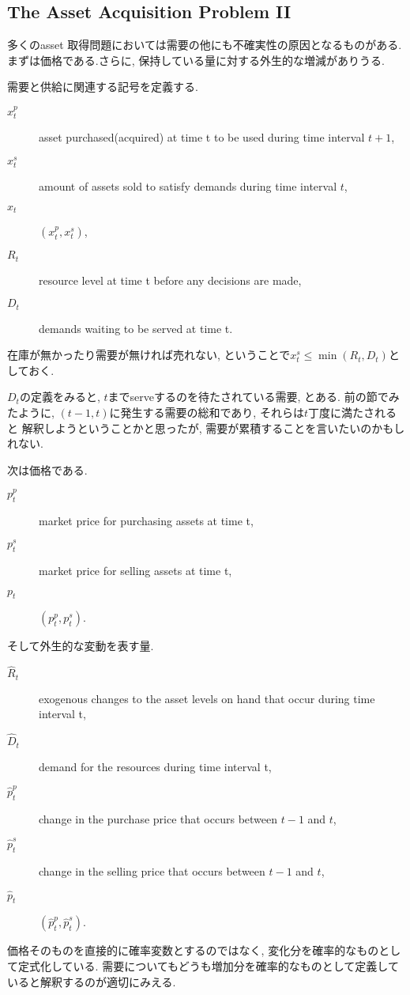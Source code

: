 \documentclass[11pt]{jsbook}
\begin{document}
\subsection{The Asset Acquisition Problem II}
多くのasset 取得問題においては需要の他にも不確実性の原因となるものがある.
まずは価格である.さらに, 保持している量に対する外生的な増減がありうる.

需要と供給に関連する記号を定義する.
\begin{description}
	\item[$x_t^p$] asset purchased(acquired) at time t to be used during time interval $t+1$,
	\item[$x_t^s$] amount of assets sold to satisfy demands during time interval $t$,
	\item[$x_t$] $(x_t^p, x_t^s)$,
	\item[$R_t$] resource level at time t before any decisions are made,
	\item[$D_t$] demands waiting to be served at time t.	
\end{description}
在庫が無かったり需要が無ければ売れない, ということで$x_t^s \le \min (R_t, D_t) $としておく.

$D_t$の定義をみると, $t$までserveするのを待たされている需要, とある.
前の節でみたように, $(t-1, t)$に発生する需要の総和であり, それらは$t$丁度に満たされると
解釈しようということかと思ったが, 需要が累積することを言いたいのかもしれない.

次は価格である.
\begin{description}
	\item[$p_t^p$] market price for purchasing assets at time t,
	\item[$p_t^s$] market price for selling assets at time t,
	\item[$p_t$] $(p_t^p, p_t^s)$.
\end{description}

そして外生的な変動を表す量.
\begin{description}
	\item[$\hat{R}_t$] exogenous changes to the asset levels on hand that occur during time interval t,
	\item[$\hat{D}_t$] demand for the resources during time interval t,
	\item[$\hat{p}_t^p$] change in the purchase price that occurs between $t-1$ and $t$,
	\item[$\hat{p}_t^s$] change in the selling price that occurs between $t-1$ and $t$,
	\item[$\hat{p}_t$] $(\hat{p}_t^p, \hat{p}_t^s)$.
\end{description}
価格そのものを直接的に確率変数とするのではなく, 変化分を確率的なものとして定式化している.
需要についてもどうも増加分を確率的なものとして定義していると解釈するのが適切にみえる.
\end{document}
